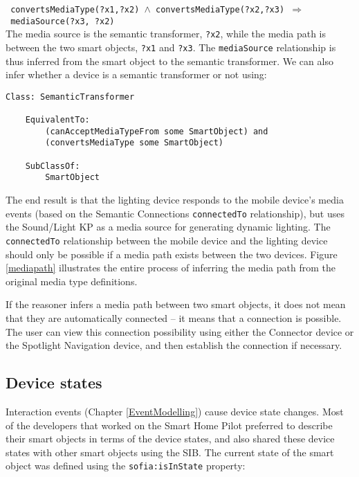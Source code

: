 \texttt{\scriptsize
convertsMediaType(?x1,?x2)~\ensuremath{\wedge}~convertsMediaType(?x2,?x3)~\ensuremath{\Rightarrow}~mediaSource(?x3, ?x2)}\\

The media source is the semantic transformer, \texttt{?x2}, while the media path is between the two smart objects, \texttt{?x1} and \texttt{?x3}. The \texttt{mediaSource} relationship is thus inferred from the smart object to the semantic transformer. We can also infer whether a device is a semantic transformer or not using:


\begin{verbatim}
Class: SemanticTransformer

    EquivalentTo:
        (canAcceptMediaTypeFrom some SmartObject) and
        (convertsMediaType some SmartObject)

    SubClassOf:
        SmartObject
\end{verbatim}


The end result is that the lighting device responds to the mobile device's media events (based on the Semantic Connections \texttt{connectedTo} relationship), but uses the Sound/Light KP as a media source for generating dynamic lighting. The \texttt{connectedTo} relationship between the mobile device and the lighting device should only be possible if a media path exists between the two devices. Figure \ref{mediapath} illustrates the entire process of inferring the media path from the original media type definitions.

If the reasoner infers a media path between two smart objects, it does not mean that they are automatically connected -- it means that a connection is possible. The user can view this connection possibility using either the Connector device or the Spotlight Navigation device, and then establish the connection if necessary.

\subsection{Device states}

Interaction events (Chapter \ref{EventModelling}) cause device state changes. Most of the developers that worked on the Smart Home Pilot preferred to describe their smart objects in terms of the device states, and also shared these device states with other smart objects using the SIB. The current state of the smart object was defined using the \texttt{sofia:isInState} property:

